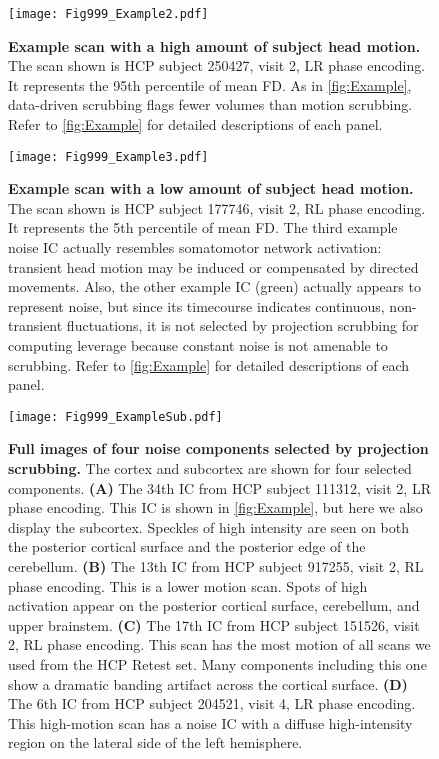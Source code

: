 \documentclass{article}
\begin{document}
\begin{figure}
    \centering
    \texttt{[image: Fig999\_Example2.pdf]}
    \caption{\small \textbf{Example scan with a high amount of subject head motion.} The scan shown is HCP subject 250427, visit 2, LR phase encoding. It represents the 95th percentile of mean FD. As in \autoref{fig:Example}, data-driven scrubbing flags fewer volumes than motion scrubbing. Refer to \autoref{fig:Example} for detailed descriptions of each panel.}
    \label{app:fig:Example2}
\end{figure}

\begin{figure}
    \centering
    \texttt{[image: Fig999\_Example3.pdf]}
    \caption{\small \textbf{Example scan with a low amount of subject head motion.} The scan shown is HCP subject 177746, visit 2, RL phase encoding. It represents the 5th percentile of mean FD. The third example noise IC actually resembles somatomotor network activation: transient head motion may be induced or compensated by directed movements. Also, the other example IC (green) actually appears to represent noise, but since its timecourse indicates continuous, non-transient fluctuations, it is not selected by projection scrubbing for computing leverage because constant noise is not amenable to scrubbing. Refer to \autoref{fig:Example} for detailed descriptions of each panel.}
    \label{app:fig:Example3}
\end{figure}

\begin{figure}
    \centering
    \texttt{[image: Fig999\_ExampleSub.pdf]}
    \caption{\small \textbf{Full images of four noise components selected by projection scrubbing.} The cortex and subcortex are shown for four selected components. \textbf{(A)} The 34th IC from HCP subject 111312, visit 2, LR phase encoding. This IC is shown in \autoref{fig:Example}, but here we also display the subcortex. Speckles of high intensity are seen on both the posterior cortical surface and the posterior edge of the cerebellum. \textbf{(B)} The 13th IC from HCP subject 917255, visit 2, RL phase encoding. This is a lower motion scan. Spots of high activation appear on the posterior cortical surface, cerebellum, and upper brainstem. \textbf{(C)} The 17th IC from HCP subject 151526, visit 2, RL phase encoding. This scan has the most motion of all scans we used from the HCP Retest set. Many components including this one show a dramatic banding artifact across the cortical surface. \textbf{(D)} The 6th IC from HCP subject 204521, visit 4, LR phase encoding. This high-motion scan has a noise IC with a diffuse high-intensity region on the lateral side of the left hemisphere.}
    \label{app:fig:ExampleSub}
\end{figure}
\end{document}
